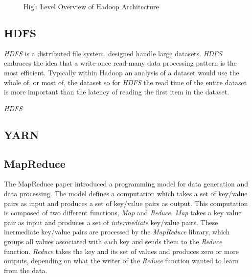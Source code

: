 \documentclass[conference]{IEEEtran}
\begin{document}
\begin{figure}[ht]
\begin{center}
\caption{High Level Overview of Hadoop Architecture}
\label{highlevelarch}
\end{center}
\end{figure}

\subsection{HDFS}
\emph{HDFS} is a distributed file system, designed handle large datasets. \emph{HDFS} embraces the idea that a write-once read-many data processing pattern is the most efficient. Typically within Hadoop an analysis of a dataset would use the whole of, or most of, the dataset so for \emph{HDFS} the read time of the entire dataset is more important than the latency of reading the first item in the dataset. 

\emph{HDFS} 

\subsection{YARN}


\subsection{MapReduce}
The MapReduce paper \cite{mapreduce} introduced a programming model for data generation and data processing. The model defines a computation which takes a set of key/value pairs as input and produces a set of key/value pairs as output.
This computation is composed of two different functions, \emph{Map} and \emph{Reduce}. \emph{Map} takes a key value pair as input and produces a set of \emph{intermediate} key/value pairs. These inermediate key/value pairs are processed by the \emph{MapReduce} library, which groups all values associated with each key and sends them to the \emph{Reduce} function. \emph{Reduce} takes the key and its set of values and produces zero or more outputs, depending on what the writer of the \emph{Reduce} function wanted to learn from the data.
\end{document}

